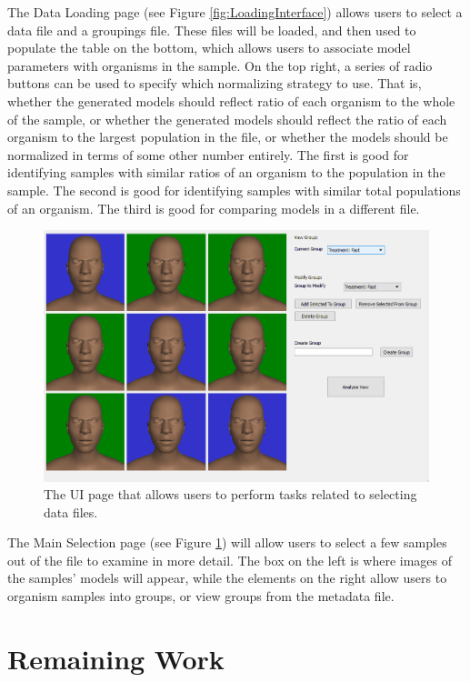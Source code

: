 \documentclass[letterpaper,10pt, onecolumn, draftclsnofoot]{IEEEtran}
\begin{document}
The Data Loading page (see Figure \ref{fig:LoadingInterface}) allows users to select a data file and a groupings file. These files will be loaded, and then used to populate the table on the bottom, which allows users to associate model parameters with organisms in the sample. On the top right, a series of radio buttons can be used to specify which normalizing strategy to use. That is, whether the generated models should reflect ratio of each organism to the whole of the sample, or whether the generated models should reflect the ratio of each organism to the largest population in the file, or whether the models should be normalized in terms of some other number entirely. The first is good for identifying samples with similar ratios of an organism to the population in the sample. The second is good for identifying samples with similar total populations of an organism. The third is good for comparing models in a different file.

\begin{figure}
	\includegraphics[width=\textwidth]{Comparison}
	\caption{The UI page that allows users to perform tasks related to selecting data files.}
	\label{fig:MainInterface}
\end{figure}

The Main Selection page (see Figure \ref{fig:MainInterface}) will allow users to select a few samples out of the file to examine in more detail. The box on the left is where images of the samples' models will appear, while the elements on the right allow users to organism samples into groups, or view groups from the metadata file.

\section{Remaining Work}\label{rWork}
\end{document}

